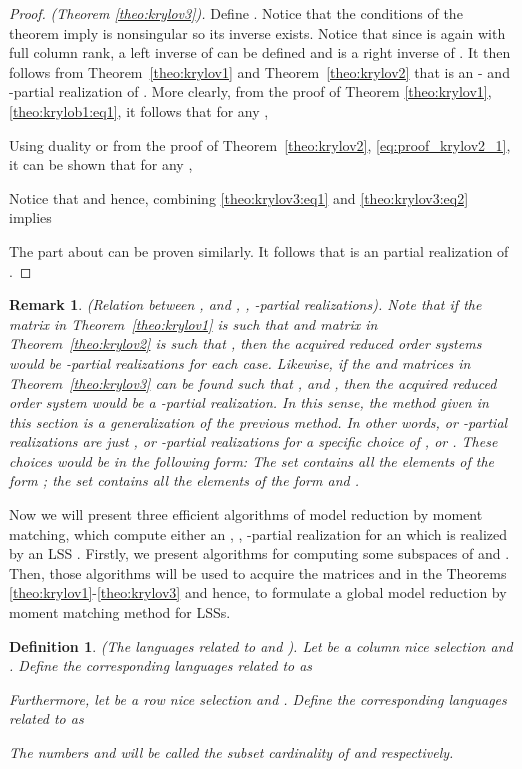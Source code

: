 \documentclass[journal]{IEEEtran}
\newtheorem{Definition}{Definition}
\newtheorem{Remark}{Remark}
\begin{document}
\begin{proof}\emph{(Theorem \ref{theo:krylov3}).}
	Define . Notice that the conditions of the theorem imply  is nonsingular so its inverse  exists. Notice that since  is again  with full column rank, a left inverse  of  can be defined and  is a right inverse of . It then follows from Theorem~\ref{theo:krylov1} and Theorem~\ref{theo:krylov2} that  is an - and -partial realization of . More clearly, from the proof of Theorem \ref{theo:krylov1}, \eqref{theo:krylob1:eq1}, it follows that for any ,
	
	Using duality or from the proof of Theorem~\ref{theo:krylov2}, \eqref{eq:proof_krylov2_1}, it can be shown that for any ,
	
	Notice that  and hence, combining \eqref{theo:krylov3:eq1} and \eqref{theo:krylov3:eq2} implies
	
	The part about  can be proven similarly. It follows that  is an  partial realization of . 
\end{proof}

\begin{Remark}
	\emph{(Relation between ,  and , , -partial realizations).}
	Note that if the  matrix in Theorem~\ref{theo:krylov1} is such that  and  matrix in Theorem~\ref{theo:krylov2} is such that , then the acquired reduced order systems would be -partial realizations for each case. Likewise, if the  and  matrices in Theorem~\ref{theo:krylov3} can be found such that ,  and , then the acquired reduced order system would be a -partial realization. In this sense, the method given in this section is a generalization of the previous method. In other words,  or -partial realizations are just ,  or -partial realizations for a specific choice of ,  or . These choices would be in the following form: The set  contains all the elements of the form ; the set  contains all the elements of the form  and .
\end{Remark}


Now we will present three efficient algorithms of model reduction by moment matching, which compute either an , , -partial realization  for an  which is realized by an LSS . Firstly, we present algorithms for computing some subspaces of  and . Then, those algorithms will be used to acquire the matrices  and  in the Theorems \ref{theo:krylov1}-\ref{theo:krylov3} and hence, to formulate a global model reduction by moment matching method for LSSs.

\begin{Definition} \label{def:subsets}
	\emph{(The languages related to  and ).}
	Let  be a column nice selection and  . Define the corresponding languages related to  as
	
	Furthermore, let  be a row nice selection and . Define the corresponding languages related to  as
	
	The numbers  and  will be called the \emph{subset cardinality} of  and  respectively.
\end{Definition}
\end{document}
